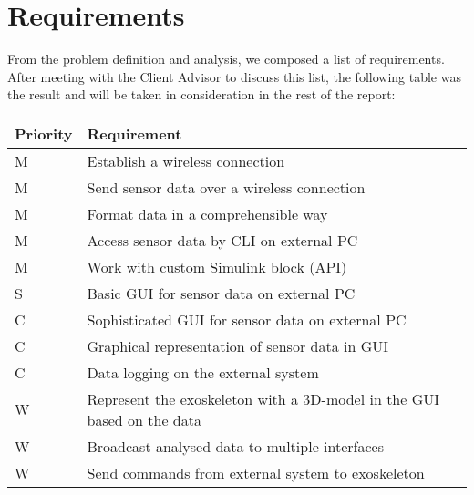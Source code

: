\section{Requirements}\label{sec:req}
From the problem definition and analysis, we composed a list of requirements.
After meeting with the Client Advisor to discuss this list, the following table was the result and will be taken in consideration in the rest of the report:\\

{\renewcommand{\arraystretch}{1.5}
	\centering
	\begin{tabular}{ | l | l | }
		\hline
		\bfseries{Priority} & \bfseries{Requirement} \\ \hline
		M & Establish a wireless connection \\ \hline
		M & Send sensor data over a wireless connection \\ \hline
		M & Format data in a comprehensible way \\ \hline
		M & Access sensor data by CLI on external PC \\ \hline
		M & Work with custom Simulink block (API) \\ \hline
		S & Basic GUI for sensor data on external PC \\ \hline
		C & Sophisticated GUI for sensor data on external PC\\ \hline
		C & Graphical representation of sensor data in GUI\\ \hline
		C & Data logging on the external system \\ \hline
		W & Represent the exoskeleton with a 3D-model in the GUI based on the data \\ \hline
		W & Broadcast analysed data to multiple interfaces \\ \hline 
		W & Send commands from external system to exoskeleton \\ \hline 
	\end{tabular}
	\label{table:requi}
}